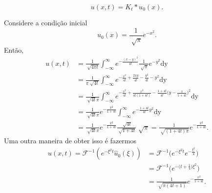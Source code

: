 \documentclass[../pde_notes.tex]{subfiles}
\begin{document}
\[
	u(x, t) = K_t*u_{0}(x).
\]
\begin{example}
	Considere a condição inicial
	\[
		u_{0}(x) = \frac{1}{\sqrt[]{\pi }}e^{-x^{2}}.
	\]
	Então,
	\begin{align*}
		u(x, t) & = \frac{1}{\sqrt[]{4\pi t}}\int_{-\infty}^{\infty}e^{-\frac{(x-y)^{2}}{4t}}\frac{1}{\sqrt[]{\pi }}e^{-y^{2}} \mathrm{dy}                                     \\
		        & = \frac{1}{\pi \sqrt[]{4t}}\int_{-\infty}^{\infty}e^{-\frac{x^{2}}{4t}+\frac{2xy}{4t}-\frac{y^{2}}{4t}-y^{2}} \mathrm{dy}                                    \\
		        & = \frac{1}{\sqrt[]{4t}\pi }\int_{-\infty}^{\infty}e^{-\frac{x^{2}}{4t}+\frac{x^{2}}{4t(1+4t)} - \frac{1+4t}{4t}\bigl(y-\frac{x}{1+4t}\bigr)^{2}} \mathrm{dy} \\
		        & = \frac{1}{\sqrt[]{4t}\pi } e^{-\frac{x^{2}}{1+4t}}\int_{-\infty}^{\infty}e^{-\frac{1+4t}{4t}y^{2}} \mathrm{dy}                                              \\
		        & = \frac{1}{\sqrt[]{4t}\pi }e^{-\frac{x^{2}}{1+4t}}\frac{\sqrt[]{4t}}{\sqrt[]{1+4t}}\sqrt[]{\pi } = \frac{1}{\sqrt[]{(1+4t)\pi }}e^{-\frac{x^{2}}{1+4t}}.
	\end{align*}
	Uma outra maneira de obter isso é fazermos
	\begin{align*}
		u(x, t) = \mathcal{F}^{-1}(e^{-\xi^{2}t}\hat{u}_{0}(\xi )) & = \mathcal{F}^{-1}\biggl(e^{-\xi ^{2}t}e^{-\frac{\xi^{2}}{4}}\biggr)     \\
		                                                           & = \mathcal{F}^{-1}\biggl(e^{-\bigl( t + \frac{1}{4}\bigr)\xi^{2}}\biggr) \\
		                                                           & = \frac{1}{\sqrt[]{\pi (4t+1)}}e^{-\frac{x^{2}}{1+4t}}.
	\end{align*}
\end{example}
\end{document}
